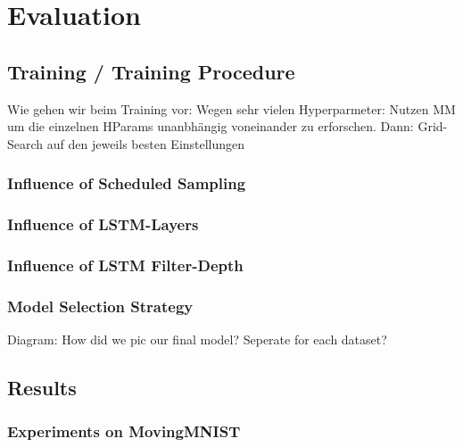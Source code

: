 

\chapter{Evaluation} \label{chapter:evaluation}



\section{Training / Training Procedure}

Wie gehen wir beim Training vor: Wegen sehr vielen Hyperparmeter: Nutzen MM um die einzelnen HParams unanbhängig voneinander zu erforschen. Dann: Grid-Search auf den jeweils besten Einstellungen


\subsection{Influence of Scheduled Sampling}

\subsection{Influence of LSTM-Layers}

\subsection{Influence of LSTM Filter-Depth}

\subsection{Model Selection Strategy}

Diagram: How did we pic our final model?
Seperate for each dataset?


\section{Results}

\subsection{Experiments on MovingMNIST}

